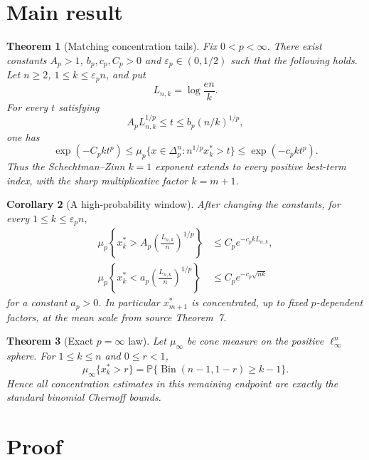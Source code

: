 \documentclass[11pt]{article}
\newtheorem{theorem}{Theorem}
\newtheorem{corollary}[theorem]{Corollary}
\newcommand{\Pp}{\mathbb P}
\begin{document}
\section*{Main result}

\begin{theorem}[Matching concentration tails]\label{thm:tails}
Fix $0<p<\infty$.  There exist constants
$A_p>1$, $b_p,c_p,C_p>0$ and $\varepsilon_p\in(0,1/2)$ such that the following
holds.  Let $n\geq2$, $1\leq k\leq\varepsilon_p n$, and put
\[
 L_{n,k}=\log\frac{en}{k}.
\]
For every $t$ satisfying
\begin{equation}\label{eq:range}
 A_pL_{n,k}^{1/p}\leq t\leq b_p(n/k)^{1/p},
\end{equation}
one has
\begin{equation}\label{eq:tails}
 \exp(-C_pkt^p)
 \leq
 \mu_p\{x\in\Delta_p^n:n^{1/p}x_k^*>t\}
 \leq
 \exp(-c_pkt^p).
\end{equation}
Thus the Schechtman--Zinn $k=1$ exponent extends to every positive
best-term index, with the sharp multiplicative factor $k=m+1$.
\end{theorem}

\begin{corollary}[A high-probability window]\label{cor:window}
After changing the constants, for every $1\leq k\leq\varepsilon_p n$,
\begin{align*}
 \mu_p\!\left\{x_k^*>A_p\left(\frac{L_{n,k}}n\right)^{1/p}\right\}
 &\leq C_p e^{-c_pkL_{n,k}},\\
 \mu_p\!\left\{x_k^*<a_p\left(\frac{L_{n,k}}n\right)^{1/p}\right\}
 &\leq C_p e^{-c_p\sqrt{nk}}
\end{align*}
for a constant $a_p>0$.  In particular $x_{m+1}^*$ is concentrated, up to
fixed $p$-dependent factors, at the mean scale from source Theorem~7.
\end{corollary}

\begin{theorem}[Exact $p=\infty$ law]\label{thm:infty}
Let $\mu_\infty$ be cone measure on the positive $\ell_\infty^n$ sphere.
For $1\leq k\leq n$ and $0\leq r<1$,
\[
 \mu_\infty\{x_k^*>r\}
 =\Pp\{\operatorname{Bin}(n-1,1-r)\geq k-1\}.
\]
Hence all concentration estimates in this remaining endpoint are exactly the
standard binomial Chernoff bounds.
\end{theorem}

\section*{Proof}
\end{document}
